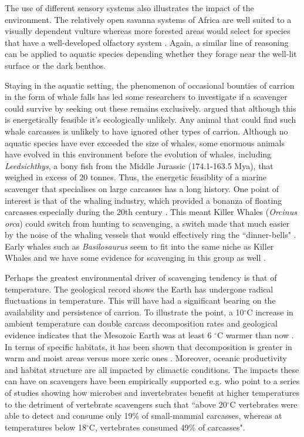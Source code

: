 \documentclass[a4paper,12pt]{article}
\begin{document}
The use of different sensory systems also illustrates the impact of the environment. 
The relatively open savanna systems of Africa are well suited to a visually dependent vulture whereas more forested areas would select for species that have a well-developed olfactory system  \citep{houston1986olfaction}. 
Again, a similar line of reasoning can be applied to aquatic species depending whether they forage near the well-lit surface or the dark benthos. 

Staying in the aquatic setting, the phenomenon of occasional bounties of carrion in the form of whale falls has led some researchers to investigate if a scavenger could survive by seeking out these remains exclusively.
\cite{ruxton2005searching} argued that although this is energetically feasible it's ecologically unlikely.
Any animal that could find such whale carcasses is unlikely to have ignored other types of carrion.
Although no aquatic species have ever exceeded the size of whales, some enormous animals have evolved in this environment before the evolution of whales, including \textit{Leedsichthys}, a bony fish from the Middle Jurassic (174.1-163.5 Mya), that weighed in excess of 20 tonnes.
Thus, the energetic feasiblity of a marine scavenger that specialises on large carcasses has a long history.
One point of interest is that of the whaling industry, which provided a bonanza of floating carcasses especially during the 20th century \citep{Whitehead415}.
This meant Killer Whales (\textit{Orcinus orca}) could switch from hunting to scavenging, a switch made that much easier by the noise of the whaling vessels that would effectively ring the ``dinner-bells" \citep{Whitehead415}.
Early whales such as \textit{Basilosaurus} seem to fit into the same niche as Killer Whales and we have some evidence for scavenging in this group as well \citep{fahlke2012bite}.

Perhaps the greatest environmental driver of scavenging tendency is that of temperature. 
The geological record shows the Earth has undergone radical fluctuations in temperature.
This will have had a significant bearing on the availability and persistence of carrion.
To illustrate the point, a 10$^{\circ}$C increase in ambient temperature can double carcass decomposition rates \citep{parmenter2009carrion} and geological evidence indicates that the Mesozoic Earth was at least 6 $^{\circ}$C warmer than now \citep{sellwood2006mesozoic}.
In terms of specific habitats, it has been shown that decomposition is greater in warm and moist areas versus more xeric ones \citep{beasley2015vertebrates}.
Moreover, oceanic productivity and habitat structure are all impacted by climactic conditions.
The impacts these can have on scavengers have been empirically supported e.g.
\cite{beasley2015vertebrates} who point to a series of studies showing how microbes and invertebrates benefit at higher temperatures to the detriment of vertebrate scavengers such that ``above 20$^{\circ}$C vertebrates were able to detect and consume only 19\% of small-mammal carcasses, whereas at temperatures below 18$^{\circ}$C, vertebrates consumed 49\% of carcasses".
\end{document}
